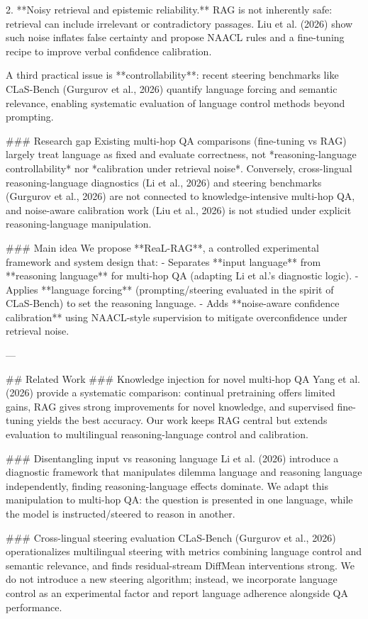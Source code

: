 2. **Noisy retrieval and epistemic reliability.** RAG is not inherently safe: retrieval can include irrelevant or contradictory passages. Liu et al. (2026) show such noise inflates false certainty and propose NAACL rules and a fine-tuning recipe to improve verbal confidence calibration.

A third practical issue is **controllability**: recent steering benchmarks like CLaS-Bench (Gurgurov et al., 2026) quantify language forcing and semantic relevance, enabling systematic evaluation of language control methods beyond prompting.

### Research gap
Existing multi-hop QA comparisons (fine-tuning vs RAG) largely treat language as fixed and evaluate correctness, not *reasoning-language controllability* nor *calibration under retrieval noise*. Conversely, cross-lingual reasoning-language diagnostics (Li et al., 2026) and steering benchmarks (Gurgurov et al., 2026) are not connected to knowledge-intensive multi-hop QA, and noise-aware calibration work (Liu et al., 2026) is not studied under explicit reasoning-language manipulation.

### Main idea
We propose **ReaL-RAG**, a controlled experimental framework and system design that:
- Separates **input language** from **reasoning language** for multi-hop QA (adapting Li et al.’s diagnostic logic).
- Applies **language forcing** (prompting/steering evaluated in the spirit of CLaS-Bench) to set the reasoning language.
- Adds **noise-aware confidence calibration** using NAACL-style supervision to mitigate overconfidence under retrieval noise.

---

## Related Work
### Knowledge injection for novel multi-hop QA
Yang et al. (2026) provide a systematic comparison: continual pretraining offers limited gains, RAG gives strong improvements for novel knowledge, and supervised fine-tuning yields the best accuracy. Our work keeps RAG central but extends evaluation to multilingual reasoning-language control and calibration.

### Disentangling input vs reasoning language
Li et al. (2026) introduce a diagnostic framework that manipulates dilemma language and reasoning language independently, finding reasoning-language effects dominate. We adapt this manipulation to multi-hop QA: the question is presented in one language, while the model is instructed/steered to reason in another.

### Cross-lingual steering evaluation
CLaS-Bench (Gurgurov et al., 2026) operationalizes multilingual steering with metrics combining language control and semantic relevance, and finds residual-stream DiffMean interventions strong. We do not introduce a new steering algorithm; instead, we incorporate language control as an experimental factor and report language adherence alongside QA performance.

